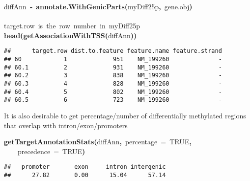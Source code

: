 \documentclass{article}
\makeatletter
\newcommand{\hlnumber}[1]{\textcolor[rgb]{0,0,0}{#1}}%
\newcommand{\hlfunctioncall}[1]{\textcolor[rgb]{.5,0,.33}{\textbf{#1}}}%
\newcommand{\hlkeyword}[1]{\textbf{#1}}%
\newcommand{\hlargument}[1]{\textcolor[rgb]{.69,.25,.02}{#1}}%
\newcommand{\hlcomment}[1]{\textcolor[rgb]{.18,.6,.34}{#1}}%
\newcommand{\hlassignement}[1]{\textbf{#1}}%
\newcommand{\hlsymbol}[1]{#1}%
\newcommand{\hlstd}[1]{\textcolor[rgb]{0,0,0}{#1}}%
\newenvironment{kframe}{%
 \def\FrameCommand##1{\hskip\@totalleftmargin \hskip-\fboxsep
 \colorbox{shadecolor}{##1}\hskip-\fboxsep
     \hskip-\linewidth \hskip-\@totalleftmargin \hskip\columnwidth}%
 \MakeFramed {\advance\hsize-\width
   \@totalleftmargin\z@ \linewidth\hsize
   \@setminipage}}%
 {\par\unskip\endMakeFramed}
\newenvironment{knitrout}{}{} %
\makeatother
\begin{document}
\begin{knitrout}
\color{fgcolor}\begin{kframe}
\begin{flushleft}
\ttfamily\noindent
\hlsymbol{diffAnn}{\ }\hlassignement{\usebox{\hlnormalsizeboxlessthan}-}{\ }\hlfunctioncall{annotate.WithGenicParts}\hlkeyword{(}\hlsymbol{myDiff25p}\hlkeyword{,}{\ }\hlsymbol{gene.obj}\hlkeyword{)}\hspace*{\fill}\\
\hlstd{}\hspace*{\fill}\\
\hlstd{}\hlcomment{\usebox{\hlnormalsizeboxhash}{\ }target.row{\ }is{\ }the{\ }row{\ }number{\ }in{\ }myDiff25p}\hspace*{\fill}\\
\hlstd{}\hlfunctioncall{head}\hlkeyword{(}\hlfunctioncall{getAssociationWithTSS}\hlkeyword{(}\hlsymbol{diffAnn}\hlkeyword{)}\hlkeyword{)}\mbox{}
\normalfont
\end{flushleft}
\begin{verbatim}
##      target.row dist.to.feature feature.name feature.strand
## 60            1             951    NM_199260              -
## 60.1          2             931    NM_199260              -
## 60.2          3             838    NM_199260              -
## 60.3          4             828    NM_199260              -
## 60.4          5             802    NM_199260              -
## 60.5          6             723    NM_199260              -
\end{verbatim}
\end{kframe}
\end{knitrout}


It is also desirable to get percentage/number of differentially methylated regions that overlap with intron/exon/promoters

\begin{knitrout}
\color{fgcolor}\begin{kframe}
\begin{flushleft}
\ttfamily\noindent
\hlfunctioncall{getTargetAnnotationStats}\hlkeyword{(}\hlsymbol{diffAnn}\hlkeyword{,}{\ }\hlargument{percentage}{\ }\hlargument{=}{\ }\hlnumber{TRUE}\hlkeyword{,}\hspace*{\fill}\\
\hlstd{}{\ }{\ }{\ }{\ }\hlargument{precedence}{\ }\hlargument{=}{\ }\hlnumber{TRUE}\hlkeyword{)}\mbox{}
\normalfont
\end{flushleft}
\begin{verbatim}
##   promoter       exon     intron intergenic 
##      27.82       0.00      15.04      57.14 
\end{verbatim}
\end{kframe}
\end{knitrout}
\end{document}
